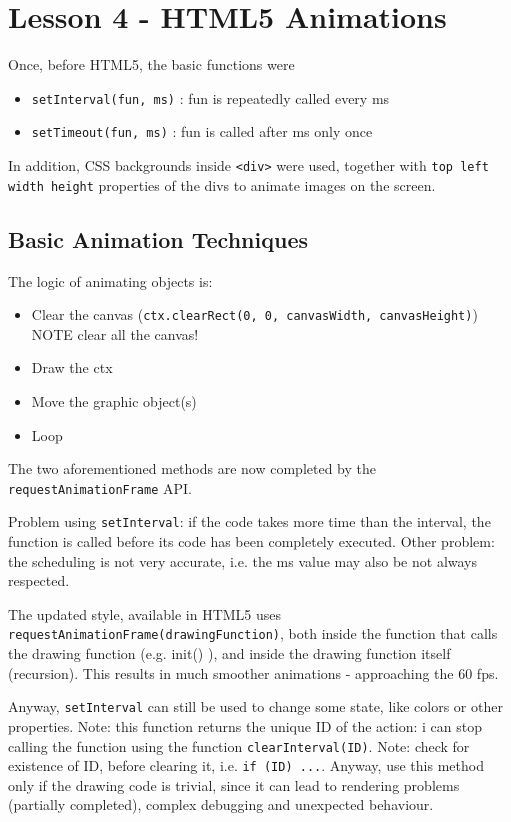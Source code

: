 \documentclass[a4paper,11pt]{book}
\begin{document}
\chapter{Lesson 4 - HTML5 Animations}
Once, before HTML5, the basic functions were
\begin{itemize}
\item \texttt{setInterval(fun, ms)} : fun is repeatedly called every ms
\item \texttt{setTimeout(fun, ms)}  : fun is called after ms only once
\end{itemize}
In addition, CSS backgrounds inside \texttt{<div>} were used, together
with \texttt{top left width height} properties of the divs to animate
images on the screen.

\section{Basic Animation Techniques}
The logic of animating objects is:
\begin{itemize}
\item Clear the canvas
(\texttt{ctx.clearRect(0, 0, canvasWidth, canvasHeight)}) NOTE clear all
the canvas!
\item Draw the ctx
\item Move the graphic object(s)
\item Loop
\end{itemize}
The two aforementioned methods are now completed by the
\texttt{requestAnimationFrame} API.

Problem using \texttt{setInterval}: if the code takes more time than
the interval, the function is called before its code has been completely
executed.
Other problem: the scheduling is not very accurate, i.e. the ms value may also be not
always respected.

The updated style, available in HTML5 uses \texttt{requestAnimationFrame(drawingFunction)}, both
inside the function that calls the drawing function (e.g. init() ), and inside the drawing function
itself (recursion). This results in much smoother animations - approaching the 60 fps.

Anyway, \texttt{setInterval} can still be used to change some state, like colors or other properties.
Note: this function returns the unique ID of the action: i can stop calling the function using the function
\texttt{clearInterval(ID)}. Note: check for existence of ID, before clearing it, i.e.
\texttt{if (ID) ...}. Anyway, use this method only if the drawing code is trivial, since it can lead
to rendering problems (partially completed), complex debugging and unexpected behaviour.
\end{document}
